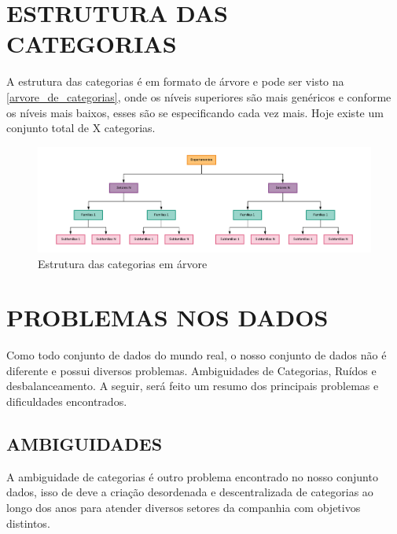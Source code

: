 \section{ESTRUTURA DAS CATEGORIAS}

A estrutura das categorias é em formato de árvore e pode ser visto na \autoref{arvore_de_categorias}, onde os níveis superiores são mais genéricos e conforme os níveis mais baixos, esses são se especificando cada vez mais. Hoje existe um conjunto total de X categorias.

\begin{figure}[htb]
	\caption{\label{arvore_de_categorias} Estrutura das categorias em árvore}
	\begin{center}
	    \includegraphics[scale=0.5]{artigo/recursos/imagens/arvore-de-categorias.png}
	\end{center}
\end{figure}


\section{PROBLEMAS NOS DADOS}

Como todo conjunto de dados do mundo real, o nosso conjunto de dados não é diferente e possui diversos problemas. Ambiguidades de Categorias, Ruídos e desbalanceamento. A seguir, será feito um resumo dos principais problemas e dificuldades encontrados.

\subsection{AMBIGUIDADES}

A ambiguidade de categorias é outro problema encontrado no nosso conjunto dados, isso de deve a criação desordenada e descentralizada de categorias ao longo dos anos para atender diversos setores da companhia com objetivos distintos. 

